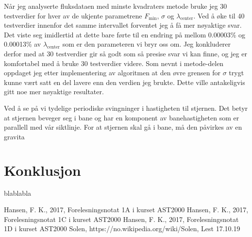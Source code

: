 \documentclass[reprint, english,notitlepage]{revtex4-1}  %
\begin{document}
Når jeg analyserte fluksdataen med minste kvadraters metode bruke jeg 30 testverdier for hver av
 de ukjente parametrene $F_{\text{min}}$, $\sigma$ og $\lambda_{\text{center}}$. Ved å øke til 40 testverdier
 innenfor det samme intervallet forventet jeg å få mer nøyaktige svar. Det viste seg imidlertid
 at dette bare førte til en endring på mellom 0.00003\% og 0.00013\% av $\lambda_{\text{center}}$ som er
 den parameteren vi bryr oss om. Jeg konkluderer derfor med at 30 testverdier gir så godt som så
 presise svar vi kan finne, og jeg er komfortabel med å bruke 30 testverdier videre. Som nevnt i
 metode-delen oppdaget jeg etter implementering av algoritmen at den øvre grensen for $\sigma$
 trygt kunne vært satt en del lavere enn den verdien jeg brukte. Dette ville antakeligvis gitt
 noe mer nøyaktige resultater.

Ved å se på  vi tydelige periodiske svingninger i hastigheten til
 stjernen. Det betyr at stjernen beveger seg i bane og har en komponent av banehastigheten som er
 parallell med vår siktlinje. For at stjernen skal gå i bane, må den påvirkes av en
 gravita


\section{Konklusjon}
blablabla



\onecolumngrid
\vspace{1cm} %


\begin{thebibliography}{}
 Hansen, F. K.,  2017, Forelesningsnotat 1A i kurset AST2000
 Hansen, F. K.,  2017, Forelesningsnotat 1C i kurset AST2000
 Hansen, F. K.,  2017, Forelesningsnotat 1D i kurset AST2000
 Solen, https://no.wikipedia.org/wiki/Solen, Lest 17.10.19

\end{thebibliography}
\end{document}
